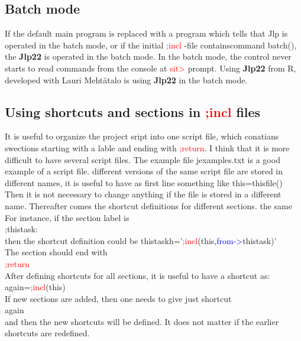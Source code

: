 {\subsection{Batch mode} 
\label{batch} 
If the default main program is replaced with a program which tells that Jlp is operated 
in the batch mode, or if the initial   \textcolor{Red}{;incl} -file containscommand \textcolor{VioletRed}{batch}(), the \textbf{Jlp22} is operated in 
the batch mode. In the batch mode, the control never starts to read commands from the 
console at \textcolor{Red}{sit>} prompt. Using \textbf{Jlp22} from R, developed with Lauri Meht\"atalo is using \textbf{Jlp22} in the batch mode. 
\subsection{Using shortcuts and sections in \textcolor{Red}{;incl} files} 
\label{operation2} 
 
It is useful to organize 
the project sript into one script file, which conatians swections starting with a lable and ending 
with \textcolor{Red}{;return}. 
I think that it is more difficult to have several script files. 
The example file jexamples.txt is a good example of a script file. 
different versions of the same script file are stored in different names, it is useful to have 
as first line something like 
this=\textcolor{VioletRed}{thisfile}()\\ 
Then it is not necessary to change anything if the file is stored in a different name. 
Thereafter comes the shortcut definitions for different sections. 
the same 
For instance, if the section 
label is \\ 
;thistask:\\ 
then the shortcut definition could be 
thistaskh='\textcolor{Red}{;incl}(this,\textcolor{blue}{from->}thistask)'\\ 
 
The section should end with\\ 
\textcolor{Red}{;return}\\ 
After defining shortcuts for all sections, it is useful to have a shortcut as:\\ 
again=\textcolor{Red}{;incl}(this)\\ 
If new sections are added, then one needs to give just shortcut\\ 
again\\ 
and then the new shortcuts will be defined. It does not matter if the earlier shortcuts are redefined. 
 
}

